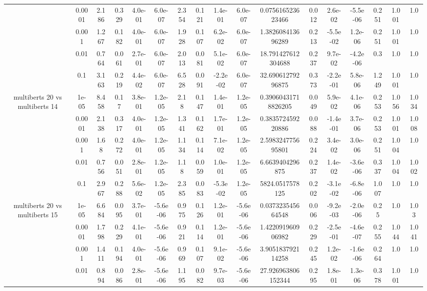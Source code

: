\begin{tabular}{|c|c|c|c|c|c|c|c|c|c|c|c|c|c|c|c|c|}
 & 0.0001 & 2.186 & 0.329 & 4.0e-01 & 6.0e-07 & 2.354 & 0.121 & 1.4e-01 & 6.0e-07 & 0.075616523623466 & 0.012 & 2.6e-02 & -5.5e-06 & 0.251 & 1.001 & 1.0 \\
 & 0.001 & 1.267 & 0.182 & 4.0e-01 & 6.0e-07 & 1.928 & 0.107 & 6.2e-02 & 6.0e-07 & 1.382608413696289 & 0.213 & -5.5e-02 & 1.2e-06 & 0.251 & 1.001 & 1.0 \\
 & 0.01 & 0.764 & 0.061 & 2.7e-01 & 6.0e-07 & 2.013 & 0.081 & 5.1e-02 & 6.0e-07 & 18.791427612304688 & 0.237 & 9.7e-02 & -4.2e-06 & 0.3 & 1.0 & 1.0 \\
 & 0.1 & 3.163 & 0.219 & 4.4e-02 & 6.0e-07 & 6.528 & 0.091 & -2.2e-02 & 6.0e-07 & 32.69061279296875 & 0.373 & -2.2e-01 & 5.8e-06 & 1.249 & 1.001 & 1.0 \\
\hline
\multirow{5}{*}{multiberts 20 vs multiberts 14} & 1e-05 & 8.458 & 0.17 & 3.8e-01 & 1.2e-05 & 2.18 & 0.147 & 1.4e-01 & 1.2e-05 & 0.39060431718826205 & 0.049 & 5.9e-02 & 4.1e-06 & 0.253 & 1.056 & 1.034 \\
 & 0.0001 & 2.138 & 0.317 & 4.0e-01 & 1.2e-05 & 1.341 & 0.162 & 1.7e-01 & 1.2e-05 & 0.383572459220886 & 0.088 & -1.4e-01 & 3.7e-06 & 0.253 & 1.001 & 1.008 \\
 & 0.001 & 1.68 & 0.272 & 4.0e-01 & 1.2e-05 & 1.134 & 0.114 & 7.1e-02 & 1.2e-05 & 2.598324775695801 & 0.224 & 3.4e-02 & 3.0e-06 & 0.251 & 1.004 & 1.0 \\
 & 0.01 & 0.756 & 0.051 & 2.8e-01 & 1.2e-05 & 1.18 & 0.059 & 1.0e-01 & 1.2e-05 & 6.6639404296875 & 0.237 & 1.4e-02 & -3.6e-06 & 0.337 & 1.004 & 1.002 \\
 & 0.1 & 2.967 & 0.288 & 5.6e-02 & 1.2e-05 & 2.385 & 0.083 & -5.3e-02 & 1.2e-05 & 5824.0517578125 & 0.202 & -3.1e-02 & -6.8e-06 & 1.007 & 1.0 & 1.0 \\
\hline
\multirow{5}{*}{multiberts 20 vs multiberts 15} & 1e-05 & 6.684 & 0.095 & 3.7e-01 & -5.6e-06 & 0.975 & 0.126 & 1.2e-01 & -5.6e-06 & 0.037323545664548 & 0.006 & -9.2e-03 & -2.0e-06 & 0.25 & 1.0 & 1.03 \\
 & 0.0001 & 1.798 & 0.229 & 4.1e-01 & -5.6e-06 & 0.921 & 0.114 & 1.2e-01 & -5.6e-06 & 1.422091960906982 & 0.229 & -2.5e-01 & -4.6e-07 & 0.255 & 1.044 & 1.041 \\
 & 0.001 & 1.411 & 0.194 & 4.0e-01 & -5.6e-06 & 0.969 & 0.107 & 9.1e-02 & -5.6e-06 & 3.905183792114258 & 0.245 & 1.2e-02 & -1.6e-06 & 0.264 & 1.0 & 1.0 \\
 & 0.01 & 0.894 & 0.086 & 2.8e-01 & -5.6e-06 & 1.195 & 0.082 & 9.7e-03 & -5.6e-06 & 27.926963806152344 & 0.295 & 1.8e-01 & 1.3e-06 & 0.378 & 1.001 & 1.0 \\

\end{tabular}
